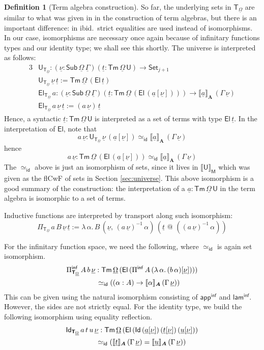 \documentclass{article}
\makeatletter
\theoremstyle{definition}
\newtheorem{definition}{Definition}
\theoremstyle{theorem}
\newcommand{\id}{\mathsf{id}}
\newcommand{\Sub}{\mathsf{Sub}}
\newcommand{\Tm}{\mathsf{Tm}}
\newcommand{\U}{\mathsf{U}}
\newcommand{\El}{\mathsf{El}}
\newcommand{\Id}{\mathsf{Id}}
\newcommand{\ra}{\rightarrow}
\newcommand{\Set}{\mathsf{Set}}
\newcommand{\Pii}{\Pi}
\newcommand{\Piinf}{\Pi^{\mathsf{inf}}}
\newcommand{\appinf}{\mathsf{app^{inf}}}
\newcommand{\laminf}{\mathsf{lam^{inf}}}
\newcommand{\appitt}{\mathop{{\scriptstyle @}}}
\newcommand{\bA}{\boldsymbol{A}}
\newcommand{\bM}{\boldsymbol{\mathsf{M}}}
\newcommand{\bT}{\boldsymbol{\mathsf{T}}}
\newcommand{\ul}[1]{\underline{#1}}
\newcommand{\ulGamma}{\ul{\Gamma}}
\newcommand{\ulOmega}{\ul{\Omega}}
\newcommand{\ulnu}{\ul{\nu}}
\newcommand{\ult}{\ul{t}}
\newcommand{\ulu}{\ul{u}}
\newcommand{\ula}{\ul{a}}
\newcommand{\llb}{\llbracket}
\newcommand{\rrb}{\rrbracket}
\makeatother
\begin{document}
\begin{definition}[Term algebra construction]
So far, the underlying sets in $\bT_{\ulOmega}$ are similar to what was given in
\cite{kaposi2019constructing} in the construction of term algebras, but there is
an important difference: in ibid.\ strict equalities are used instead of
isomorphisms. In our case, isomorphisms are necessary once again because of
infinitary functions types and our identity type; we shall see this shortly. The
universe is interpreted as follows:
\begin{alignat*}{3}
  & \U_{\bT_{\ulOmega}} : (\ulnu : \Sub\,\ulOmega\,\ulGamma)(\ult : \Tm\,\ulOmega\,\U)\ra
              \Set_{j+1}\\
  & \U_{\bT_{\ulOmega}}\,\ulnu\,\ult := \Tm\,\ulOmega\,(\El\,\ult)\\
  & \El_{\bT_{\ulOmega}}\,a : (\ulnu : \Sub\,\ulOmega\,\ulGamma)
             (\ult : \Tm\,\ulOmega\,(\El\,(\ula[\ulnu])))\ra
              \llb\ula\rrb_{\bA}\,(\Gamma\,\ulnu)\\
  & \El_{\bT_{\ulOmega}}\,a\,\ulnu\,\ult := (a\,\ulnu)\,\ult
\end{alignat*}
Hence, a syntactic $\ult : \Tm\,\ulOmega\,\U$ is interpreted as a set of terms
with type $\El\,\ult$. In the interpretation of $\El$, note that
\[
  a\,\ulnu : \U_{\bT_{\ulOmega}}\,\ulnu\,(\ula[\ulnu]) \simeq_{\id}
                 \llb\ula\rrb_{\bA}\,(\Gamma\,\ulnu)
\]
hence
\[
a\,\ulnu : \Tm\,\ulOmega\,(\El\,(\ula[\ulnu])) \simeq_{\id}
           \llb\ula\rrb_{\bA}\,(\Gamma\,\ulnu)
\]
The $\simeq_{\id}$ above is just an isomorphism of sets, since it lives in
$\llb\U\rrb_{\bM}$ which was given as the flCwF of sets in Section
\ref{sec:universe}. This above isomorphism is a good summary of the
construction: the interpretation of a $\ula : \Tm\,\ulOmega\,\U$ in the term
algebra is isomorphic to a set of terms.

Inductive functions are interpreted by transport along such isomorphism:
\[
  \Pii_{\bT_{\ulOmega}}\,a\,B\,\ulnu\,\ult := \lambda\,\alpha.\,
         B\,(\ulnu,\,(a\,\ulnu)^{-1}\,\alpha)\,(\ult\,\appitt\,((a\,\ulnu)^{-1}\,\alpha))
\]

For the infinitary function space, we need the following, where $\simeq_{\id}$ is
again set isomorphism.
\begin{alignat*}{3}
  & \Piinf_{\bT_{\ulOmega}}\,A\,b\,\ulnu : \Tm\,\ulOmega\,(\El\,(\Piinf\,A\,(\lambda\,\alpha.\,(b\,\alpha)[\ulnu])))\\
  & \hspace{4.2em}\simeq_{\id} ((\alpha : A) \ra \llb\alpha\rrb_{\bA}\,(\Gamma\,\ulnu))
\end{alignat*}
This can be given using the natural isomorphism consisting of $\appinf$ and
$\laminf$. However, the sides are not strictly equal. For the identity type, we
build the following isomorphism using equality reflection.
\begin{alignat*}{3}
  & \Id_{\bT_{\ulOmega}}\,a\,t\,u\,\ulnu : \Tm\,\ulOmega\,(\El\,(\Id\,(\ula[\ulnu])\,(\ult[\ulnu])\,(\ulu[\ulnu]))\\
  & \hspace{4.2em}\simeq_{\id} (\llb\ult\rrb_{\bA}\,(\Gamma\,\ulnu) =   \llb\ulu\rrb_{\bA}\,(\Gamma\,\ulnu))
\end{alignat*}


\end{definition}
\end{document}
